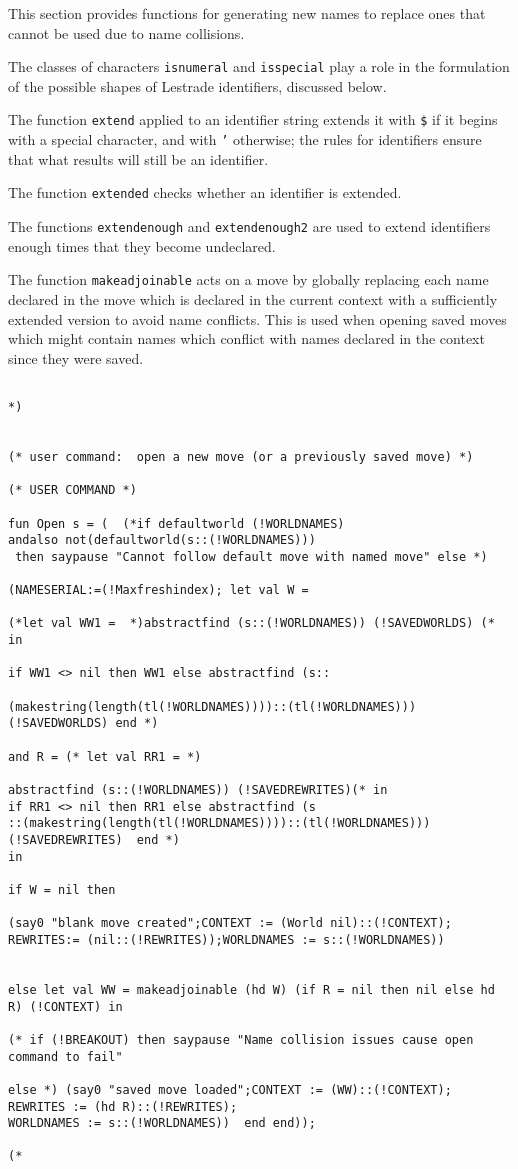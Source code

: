 \documentclass{article}
\begin{document}
This section provides functions for generating new names to replace ones that cannot be used due to name collisions.  

The classes of characters {\tt isnumeral} and {\tt isspecial} play a role in the formulation of the possible shapes of Lestrade identifiers, discussed below.

The function {\tt extend} applied to an identifier string extends it with {\tt \$} if it begins with a special character, and with {\tt '} otherwise;  the rules for
identifiers ensure that what results will still be an identifier.

The function {\tt extended} checks whether an identifier is extended.

The functions {\tt extendenough} and {\tt extendenough2} are used to extend identifiers enough times that they become undeclared.

The function {\tt makeadjoinable} acts on a move by globally replacing each name declared in the move which is declared in the current context with a sufficiently extended version to avoid name conflicts.  This is used when opening saved moves which might contain names which conflict with names declared in the context since they were saved.


\begin{verbatim}

*)
   

(* user command:  open a new move (or a previously saved move) *)

(* USER COMMAND *)

fun Open s = (  (*if defaultworld (!WORLDNAMES) 
andalso not(defaultworld(s::(!WORLDNAMES)))
 then saypause "Cannot follow default move with named move" else *)

(NAMESERIAL:=(!Maxfreshindex); let val W = 

(*let val WW1 =  *)abstractfind (s::(!WORLDNAMES)) (!SAVEDWORLDS) (* in

if WW1 <> nil then WW1 else abstractfind (s::

(makestring(length(tl(!WORLDNAMES))))::(tl(!WORLDNAMES)))
(!SAVEDWORLDS) end *)

and R = (* let val RR1 = *)

abstractfind (s::(!WORLDNAMES)) (!SAVEDREWRITES)(* in
if RR1 <> nil then RR1 else abstractfind (s
::(makestring(length(tl(!WORLDNAMES))))::(tl(!WORLDNAMES)))
(!SAVEDREWRITES)  end *)
in

if W = nil then

(say0 "blank move created";CONTEXT := (World nil)::(!CONTEXT); 
REWRITES:= (nil::(!REWRITES));WORLDNAMES := s::(!WORLDNAMES))


else let val WW = makeadjoinable (hd W) (if R = nil then nil else hd R) (!CONTEXT) in

(* if (!BREAKOUT) then saypause "Name collision issues cause open command to fail"

else *) (say0 "saved move loaded";CONTEXT := (WW)::(!CONTEXT);
REWRITES := (hd R)::(!REWRITES);
WORLDNAMES := s::(!WORLDNAMES))  end end));

(*

\end{verbatim}
\end{document}
